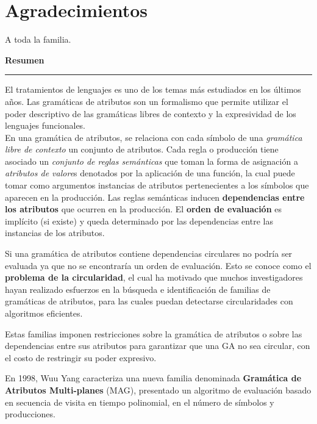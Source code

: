 \documentclass[a4paper,12pt,twoside]{ThesisStyle}
\begin{document}


\dominitoc


\cleardoublepage

\section*{Agradecimientos}

A toda la familia.

\cleardoublepage

\begin{vcenterpage}

{\large\textbf{Resumen\\}}
\noindent\rule[2pt]{\textwidth}{0.5pt}

El tratamientos de lenguajes es uno de los temas más estudiados en los últimos años.
Las gramáticas de atributos son un formalismo que permite utilizar el poder descriptivo de las gramáticas libres de contexto y la expresividad de los lenguajes funcionales.\\ 

En una gramática de atributos, se relaciona con cada símbolo de una \textit{gramática libre de contexto} un conjunto de atributos. Cada regla o producción tiene asociado un \textit{conjunto de reglas semánticas} que toman la forma de asignación a \textit{atributos de valore}s denotados por la aplicación de una función, la cual puede tomar como argumentos instancias de atributos pertenecientes a los símbolos que aparecen en la producción.
Las reglas semánticas inducen \textbf{dependencias entre los atributos} que ocurren en la producción. El \textbf{orden de evaluación} es implícito (si existe) y queda determinado por las dependencias entre las instancias de los atributos.

Si una gramática de atributos contiene dependencias circulares no podría ser evaluada ya que no se encontraría un orden de evaluación. Esto se conoce como el \textbf{problema de la circularidad}, el cual ha motivado que muchos investigadores hayan realizado esfuerzos en la búsqueda e identificación de familias de gramáticas de atributos, para las cuales puedan detectarse circularidades con algoritmos eficientes.

Estas familias imponen restricciones sobre la gramática de atributos o sobre las dependencias entre sus atributos para garantizar que una GA no sea circular, con el costo de restringir su poder expresivo.

En 1998, Wuu Yang caracteriza una nueva familia denominada \textbf{Gramática de Atributos Multi-planes} (MAG), presentado un algoritmo de evaluación basado en secuencia de visita en tiempo polinomial, en el número de símbolos y producciones.\\ 


\end{vcenterpage}
\end{document}
